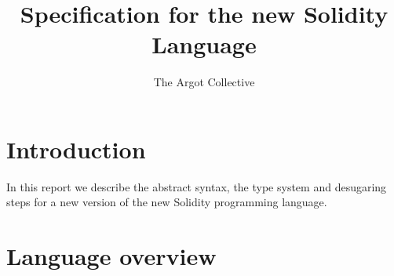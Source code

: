 \documentclass[a4paper, 11pt]{article}
\title{Specification for the new Solidity Language}
\author{The Argot Collective}
\theoremstyle{definition}
\begin{document}
\maketitle

\lstset{
  language=solidity,
  basicstyle=\ttfamily\small,
  keywordstyle=\bfseries,
}



\newcommand{\word}{\ensuremath{\mathtt{word}}}
\newcommand{\unit}{\ensuremath{\mathtt{unit}}}
\newcommand{\bool}{\ensuremath{\mathtt{bool}}}
\newcommand{\typing}[1]{\ensuremath{\overset{\text{\tiny{#1}}}{\vdash}}}
\newcommand{\cc}{\ensuremath{\overset{\text{cc}}}{\leadsto}}
\newcommand{\inst}{\ensuremath{\sqsubseteq}}
\newcommand{\invoke}{\ensuremath{\mathtt{Invokable.invoke}}}
\newcommand{\invokable}{\ensuremath{\mathtt{Invokable}}}
\newcommand{\dom}[1]{\ensuremath{\mathtt{dom}(#1)}}
\newcommand{\id}{\ensuremath{\mathtt{id}}}
\newcommand{\ftv}{\ensuremath{\mathtt{ftv}}}
\newcommand{\fpv}{\ensuremath{\mathtt{fpv}}}
\newcommand{\closuretype}{\ensuremath{\overset{\tiny{ctype}}{\leadsto}}}
\newcommand{\sig}{\ensuremath{\overset{\tiny{sig}}{\leadsto}}}
\newcommand{\unique}{\ensuremath{\overset{\tiny{unique}}{\leadsto}}}
\newcommand{\geninvoke}{\ensuremath{\overset{\tiny{gen}}{\leadsto}}}
\newcommand{\sats}[3]{\Theta ; #3 \vdash^{\mathtt{sats}} #1 \leadsto #2}
\newcommand{\mgu}{\ensuremath{\mathtt{mgu}}}
\newcommand{\reduce}{\vdash^{\mathtt{red}}}
\newcommand{\simp}{\vdash^{\mathtt{simp}}}
\newcommand{\impr}{\vdash^{\mathtt{impr}}}
\newcommand{\solidity}{new Solidity }



\section{Introduction}\label{sec:introduction}

In this report we describe the abstract syntax,
the type system and desugaring steps for a new
version of the \solidity{} programming language.

\section{Language overview}
\end{document}
